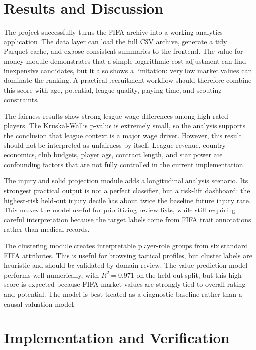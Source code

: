 \documentclass[11pt,a4paper]{article}
\begin{document}
\section{Results and Discussion}

The project successfully turns the FIFA archive into a working analytics application. The data layer can load the full CSV archive, generate a tidy Parquet cache, and expose consistent summaries to the frontend. The value-for-money module demonstrates that a simple logarithmic cost adjustment can find inexpensive candidates, but it also shows a limitation: very low market values can dominate the ranking. A practical recruitment workflow should therefore combine this score with age, potential, league quality, playing time, and scouting constraints.

The fairness results show strong league wage differences among high-rated players. The Kruskal-Wallis p-value is extremely small, so the analysis supports the conclusion that league context is a major wage driver. However, this result should not be interpreted as unfairness by itself. League revenue, country economics, club budgets, player age, contract length, and star power are confounding factors that are not fully controlled in the current implementation.

The injury and solid projection module adds a longitudinal analysis scenario. Its strongest practical output is not a perfect classifier, but a risk-lift dashboard: the highest-risk held-out injury decile has about twice the baseline future injury rate. This makes the model useful for prioritizing review lists, while still requiring careful interpretation because the target labels come from FIFA trait annotations rather than medical records.

The clustering module creates interpretable player-role groups from six standard FIFA attributes. This is useful for browsing tactical profiles, but cluster labels are heuristic and should be validated by domain review. The value prediction model performs well numerically, with \(R^2=0.971\) on the held-out split, but this high score is expected because FIFA market values are strongly tied to overall rating and potential. The model is best treated as a diagnostic baseline rather than a causal valuation model.

\section{Implementation and Verification}
\end{document}
